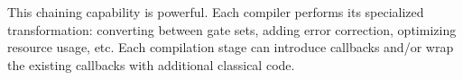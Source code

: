 This chaining capability is powerful. Each compiler performs its specialized transformation: converting between gate sets, adding error correction, optimizing resource usage, etc. %
Each compilation stage can introduce callbacks and/or wrap the existing callbacks with additional classical code.








